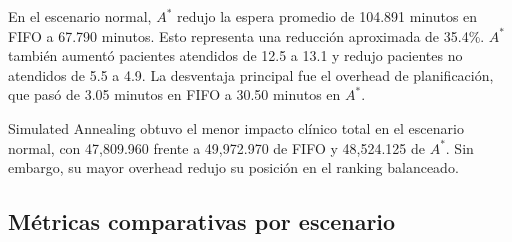 \documentclass[12pt,a4paper]{article}
\begin{document}
\begin{table}[H]
\centering
\begin{small}
%
\end{small}
\caption{Métricas principales del escenario normal.}
\label{tab:normal-metricas}
\end{table}

En el escenario normal, $A^*$ redujo la espera promedio de 104.891 minutos en FIFO a 67.790 minutos. Esto representa una reducción aproximada de 35.4\%. $A^*$ también aumentó pacientes atendidos de 12.5 a 13.1 y redujo pacientes no atendidos de 5.5 a 4.9. La desventaja principal fue el overhead de planificación, que pasó de 3.05 minutos en FIFO a 30.50 minutos en $A^*$.

Simulated Annealing obtuvo el menor impacto clínico total en el escenario normal, con 47,809.960 frente a 49,972.970 de FIFO y 48,524.125 de $A^*$. Sin embargo, su mayor overhead redujo su posición en el ranking balanceado.

\subsection{Métricas comparativas por escenario}
\end{document}
